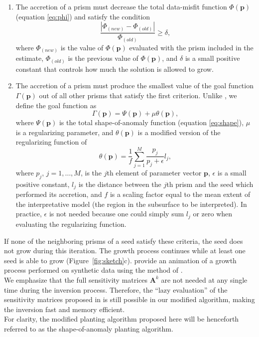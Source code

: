 \documentclass{segabs}
\newcommand{\vect}[1]{\mathbf{#1}}
\newcommand{\mat}[1]{\mathbf{#1}}
\begin{document}
\begin{sloppypar}
\begin{enumerate}
    \item The accretion of a prism must decrease the total data-misfit
    function $\Phi(\vect{p})$ (equation \ref{eq:phi}) and satisfy the condition
    \begin{equation}
        \dfrac{|\Phi_{(new)} - \Phi_{(old)}|}{\Phi_{(old)}} \ge \delta ,
        \label{eq:delta}
    \end{equation}
    where $\Phi_{(new)}$ is the value of $\Phi(\vect{p})$ evaluated with the
    prism included in the estimate, $\Phi_{(old)}$ is the previous value of 
    $\Phi(\vect{p})$, and $\delta$ is a small positive constant that controls
    how much the solution is allowed to grow.
    
    \item The accretion of a prism must produce the smallest value of the goal
    function $\Gamma(\vect{p})$ out of all other prisms that satisfy the first
    criterion. Unlike \citet{Uieda2011}, we define the goal function as    
    \begin{equation}
        \Gamma(\vect{p}) = \Psi(\vect{p}) + \mu\theta(\vect{p}),
        \label{eq:goal}
    \end{equation}
    where $\Psi(\vect{p})$ is the total shape-of-anomaly function (equation
    \ref{eq:shape}), $\mu$ is a regularizing parameter, and $\theta(\vect{p})$
    is a modified version of the regularizing function of \citet{Uieda2011}
    \begin{equation}
        \theta(\vect{p}) = \frac{1}{f} \sum\limits_{j=1}^{M}
        \dfrac{p_j}{p_j + \epsilon} l_{j},
        \label{eq:regul}
    \end{equation}
    where $p_{j}$, $j=1,\ldots,M$, is the $j$th element of parameter vector
    $\vect{p}$,
    $\epsilon$ is a small positive constant, $l_{j}$ is the distance between the
    $j$th prism and the seed which performed its accretion, and $f$ is a scaling
    factor equal to the mean extent of the interpretative model
    (the region in the subsurface to be interpreted).
    In practice, $\epsilon$ is not needed because one could simply sum $l_{j}$
    or zero when evaluating the regularizing function.
\end{enumerate}

If none of the neighboring prisms of a seed satisfy these criteria, the
seed does not grow during this iteration.
The growth process continues while at least one seed is able to grow
(Figure~\ref{fig:sketch}c).
\citet{Uieda2012} provide an animation of a growth process performed on
synthetic data using the method of \citet{Uieda2011}.
\\[0.2cm]
We emphasize that the full sensitivity matrices $\mat{A}^{k}$ are not needed
at any single time during the inversion process.
Therefore, the ``lazy evaluation'' of the sensitivity matrices
proposed in \citet{Uieda2011} is still possible
in our modified algorithm, making the inversion fast and memory efficient.
\\[0.2cm]
For clarity, the modified planting algorithm proposed here will be henceforth
referred to as the shape-of-anomaly planting algorithm.
\end{sloppypar}
\end{document}
